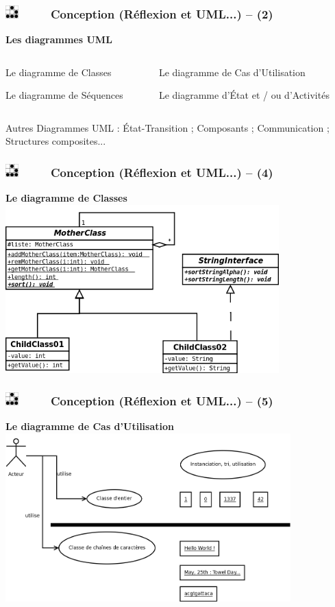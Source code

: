 \documentclass[slidetop,11pt]{beamer}
\def\sectionPartIaUN{Conception (R{\'e}flexion et UML...) -- }
\def\moreInFrameTitle{\includegraphics[height=0.5cm]{img/logo_glider.png}~~~~~}
\begin{document}
\begin{frame}
	\frametitle{\moreInFrameTitle \sectionPartIaUN (2)}
	\textbf{\large{Les diagrammes UML}}
	\begin{columns}[c]
		\begin{column}[c]{5cm}
			\begin{alertblock}{Le diagramme de Classes}
			\end{alertblock}
			
			\begin{exampleblock}{Le diagramme de S{\'e}quences}
			\end{exampleblock}
		\end{column}
		\begin{column}[c]{5cm}
			\begin{exampleblock}{Le diagramme de Cas d'Utilisation}
			\end{exampleblock}
			
			\begin{alertblock}{Le diagramme d'{\'E}tat et / ou d'Activit{\'e}s}
			\end{alertblock}
		\end{column}
	\end{columns}
	Autres Diagrammes UML : {\'E}tat-Transition ; Composants ; Communication ; Structures composites...
\end{frame} 

\begin{frame}
	\frametitle{\moreInFrameTitle \sectionPartIaUN (4)}
	\textbf{Le diagramme de Classes}
	\includegraphics[height=6.5cm]{img/diagrammeClasses.png}	
\end{frame} 

\begin{frame}
	\frametitle{\moreInFrameTitle \sectionPartIaUN (5)}
	\textbf{Le diagramme de Cas d'Utilisation}
	\includegraphics[height=6.5cm]{img/diagrammeCasUtilisation.png}
\end{frame} 
\end{document}
